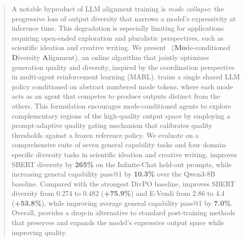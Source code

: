 \begin{abstract}




A notable byproduct of LLM alignment training is \textit{mode collapse}: the progressive loss of output diversity that narrows a model's expressivity at inference time. This degradation is especially limiting for applications requiring open-ended exploration and pluralistic perspectives, such as scientific ideation and creative writing. We present \textbf{\methodcolor}~(\textbf{Mo}de-conditioned \textbf{D}iversity \textbf{A}lignment), an online algorithm that jointly optimizes generation quality and diversity, inspired by the coordination perspective in multi-agent reinforcement learning (MARL). \method trains a single shared LLM policy conditioned on abstract numbered mode tokens, where each mode acts as an agent that competes to produce outputs distinct from the others. This formulation encourages mode-conditioned agents to explore complementary regions of the high-quality output space by employing a prompt-adaptive quality gating mechanism that calibrates quality thresholds against a frozen reference policy.
We evaluate \method{} on a comprehensive suite of seven general capability tasks and four domain-specific diversity tasks in scientific ideation and creative writing. \method{} improves SBERT diversity by \textbf{265\%} on the Infinite-Chat held-out prompts, while increasing general capability pass@1 by \textbf{10.3\%} over the Qwen3-8B baseline. Compared with the strongest DivPO baseline, \method{} improves SBERT diversity from 0.274 to 0.482 (\textbf{+75.9\%}) and E-Vendi from 2.86 to 4.4 (\textbf{+53.8\%}), while improving average general capability pass@1 by \textbf{7.0\%}. Overall, \method{} provides a drop-in alternative to standard post-training methods that preserves and expands the model's expressive output space while improving quality.



\end{abstract}

